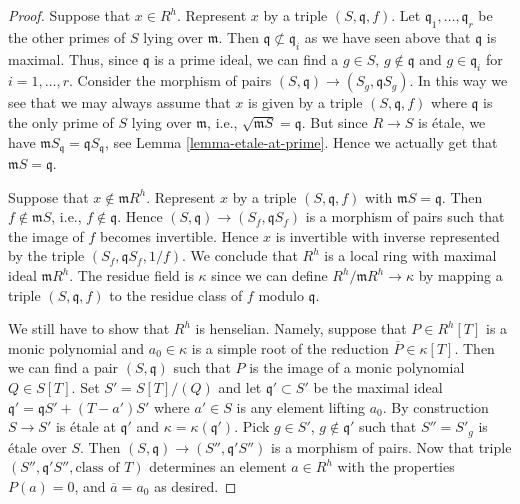 \begin{proof}
\medskip\noindent
Suppose that $x \in R^h$. Represent $x$ by a triple $(S, \mathfrak q, f)$.
Let $\mathfrak q_1, \ldots, \mathfrak q_r$ be the other primes of $S$
lying over $\mathfrak m$. Then $\mathfrak q \not \subset \mathfrak q_i$
as we have seen above that $\mathfrak q$ is maximal.
Thus, since $\mathfrak q$ is a prime ideal,
we can find a $g \in S$, $g \not \in \mathfrak q$ and
$g \in \mathfrak q_i$ for $i = 1, \ldots, r$. Consider the morphism of
pairs $(S, \mathfrak q) \to (S_g, \mathfrak qS_g)$.
In this way we see that we may always assume that $x$
is given by a triple $(S, \mathfrak q, f)$ where
$\mathfrak q$ is the only prime of $S$ lying over $\mathfrak m$,
i.e., $\sqrt{\mathfrak mS} = \mathfrak q$. But since
$R \to S$ is \'etale, we have
$\mathfrak mS_{\mathfrak q} = \mathfrak qS_{\mathfrak q}$, see
Lemma \ref{lemma-etale-at-prime}.
Hence we actually get that $\mathfrak mS = \mathfrak q$.

\medskip\noindent
Suppose that $x \not \in \mathfrak mR^h$.
Represent $x$ by a triple $(S, \mathfrak q, f)$ with
$\mathfrak mS = \mathfrak q$.
Then $f \not \in \mathfrak mS$, i.e., $f \not \in \mathfrak q$.
Hence $(S, \mathfrak q) \to (S_f, \mathfrak qS_f)$ is a morphism
of pairs such that the image of $f$ becomes invertible.
Hence $x$ is invertible with inverse represented by the triple
$(S_f, \mathfrak qS_f, 1/f)$. We conclude that $R^h$ is a local
ring with maximal ideal $\mathfrak mR^h$. The residue field is
$\kappa$ since we can define $R^h/\mathfrak mR^h \to \kappa$
by mapping a triple $(S, \mathfrak q, f)$ to the residue
class of $f$ modulo $\mathfrak q$.

\medskip\noindent
We still have to show that $R^h$ is henselian.
Namely, suppose that $P \in R^h[T]$ is a monic
polynomial and $a_0 \in \kappa$ is a simple root of
the reduction $\overline{P} \in \kappa[T]$.
Then we can find a pair $(S, \mathfrak q)$ such that
$P$ is the image of a monic polynomial $Q \in S[T]$.
Set $S' = S[T]/(Q)$ and let $\mathfrak q' \subset S'$
be the maximal ideal $\mathfrak q' = \mathfrak qS' + (T - a')S'$
where $a' \in S$ is any element lifting $a_0$.
By construction $S \to S'$ is \'etale at $\mathfrak q'$
and $\kappa = \kappa(\mathfrak q')$.
Pick $g \in S'$, $g \not \in \mathfrak q'$ such that
$S'' = S'_g$ is \'etale over $S$. Then
$(S, \mathfrak q) \to (S'', \mathfrak q'S'')$ is a morphism
of pairs. Now that triple $(S'', \mathfrak q'S'', \text{class of }T)$
determines an element $a \in R^h$ with the properties $P(a) = 0$,
and $\overline{a} = a_0$ as desired.
\end{proof}
